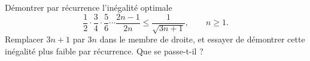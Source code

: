 Démontrer par récurrence l'inégalité optimale
\[ \frac{1}{2} \cdot \frac{3}{4} \cdot \frac{5}{6} \cdots \frac{2n - 1}{2n} \leq \frac{1}{\sqrt{3n + 1}},\qquad n \geq 1. \]
Remplacer $3n + 1$ par $3n$ dans le membre de droite, et essayer de démontrer cette inégalité plus faible par récurrence. Que se passe-t-il ?
